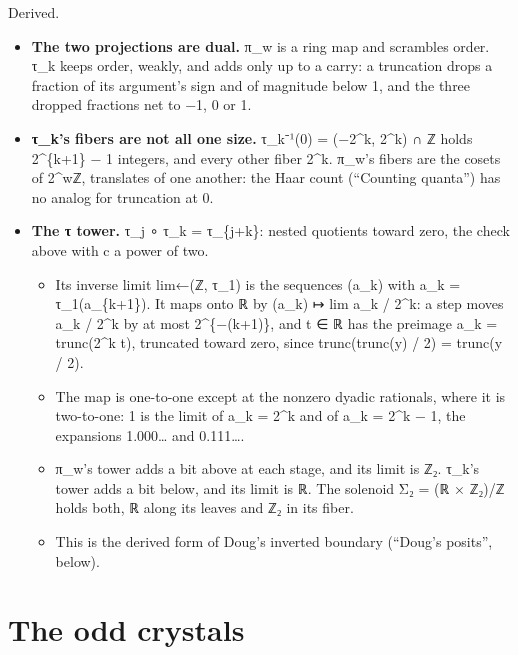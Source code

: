 Derived.

\begin{itemize}
\item \textbf{The two projections are dual.} π\_\allowbreak{}w is a ring map and scrambles order. τ\_\allowbreak{}k keeps order, weakly, and adds only up to a carry: a truncation drops a fraction of its argument's sign and of magnitude below 1, and the three dropped fractions net to −1, 0 or 1.
\item \textbf{τ\_\allowbreak{}k's fibers are not all one size.} τ\_\allowbreak{}k⁻¹(0) = (−2\textasciicircum{}k, 2\textasciicircum{}k) ∩ ℤ holds 2\textasciicircum{}\{k+1\} − 1 integers, and every other fiber 2\textasciicircum{}k. π\_\allowbreak{}w's fibers are the cosets of 2\textasciicircum{}wℤ, translates of one another: the Haar count (“Counting quanta”) has no analog for truncation at 0.
\item \textbf{The τ tower.} τ\_\allowbreak{}j ∘ τ\_\allowbreak{}k = τ\_\allowbreak{}\{j+k\}: nested quotients toward zero, the check above with c a power of two.

\begin{itemize}
\item Its inverse limit lim←(ℤ, τ\_\allowbreak{}1) is the sequences (a\_\allowbreak{}k) with a\_\allowbreak{}k = τ\_\allowbreak{}1(a\_\allowbreak{}\{k+1\}). It maps onto ℝ by (a\_\allowbreak{}k) ↦ lim a\_\allowbreak{}k / 2\textasciicircum{}k: a step moves a\_\allowbreak{}k / 2\textasciicircum{}k by at most 2\textasciicircum{}\{−(k+1)\}, and t ∈ ℝ has the preimage a\_\allowbreak{}k = trunc(2\textasciicircum{}k t), truncated toward zero, since trunc(trunc(y) / 2) = trunc(y / 2).
\item The map is one-to-one except at the nonzero dyadic rationals, where it is two-to-one: 1 is the limit of a\_\allowbreak{}k = 2\textasciicircum{}k and of a\_\allowbreak{}k = 2\textasciicircum{}k − 1, the expansions 1.000… and 0.111….
\item π\_\allowbreak{}w's tower adds a bit above at each stage, and its limit is ℤ₂. τ\_\allowbreak{}k's tower adds a bit below, and its limit is ℝ. The solenoid Σ₂ = (ℝ × ℤ₂)/ℤ holds both, ℝ along its leaves and ℤ₂ in its fiber.
\item This is the derived form of Doug's inverted boundary (“Doug's posits”, below).
\end{itemize}
\end{itemize}

\section{\texorpdfstring{The odd crystals}{The odd crystals}}


